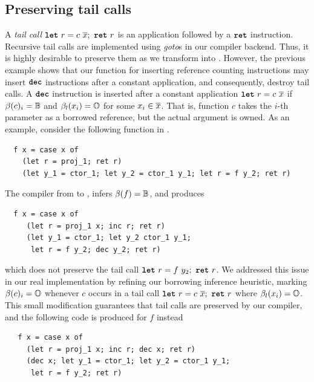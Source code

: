 \documentclass[sigconf]{acmart}
\begin{document}
\subsection*{Preserving tail calls}
A \emph{tail call} $\kw{let}\ r = c\ \many{x};\ \kw{ret}\ r$ is an
application followed by a $\texttt{\textbf{ret}}$ instruction. Recursive tail calls
are implemented using \emph{goto}s in our compiler backend. Thus, it
is highly desirable to preserve them as we transform \pureIR{} into
\rcIR{}. However, the previous example shows that our function for inserting reference
counting instructions may insert $\texttt{\textbf{dec}}$ instructions after a constant application, and
consequently, destroy tail calls. A $\texttt{\textbf{dec}}$ instruction is inserted after a constant application
$\kw{let}\ r = c\ \many{x}$ if $\beta(c)_i = \mathbb{B}{}$ and $\beta_l(x_i) = \mathbb{O}{}$ for some
$x_i \in \overline{x}$. That is, function $c$ takes the $i$-th
parameter as a borrowed reference, but the actual argument is owned. As an example,
consider the following function in \pureIR{}.
\begin{lstlisting}
  f x = case x of
    (let r = proj_1; ret r)
    (let y_1 = ctor_1; let y_2 = ctor_1 y_1; let r = f y_2; ret r)
\end{lstlisting}
The compiler from \pureIR{} to \rcIR{}, infers $\beta(f) = \mathbb{B}{}$, and produces
\begin{lstlisting}
  f x = case x of
     (let r = proj_1 x; inc r; ret r)
     (let y_1 = ctor_1; let y_2 ctor_1 y_1;
      let r = f y_2; dec y_2; ret r)
\end{lstlisting}
which does not preserve the tail call $\texttt{\textbf{let}}\ r = f\ y_2;\ \texttt{\textbf{ret}}\ r$.
We addressed this issue in our real implementation by refining our
borrowing inference heuristic, marking $\beta(c)_i = \mathbb{O}{}$ whenever
$c$ occurs in a tail call $\kw{let}\ r = c\ \many{x};\ \kw{ret}\ r$
where $\beta_l(x_i) = \mathbb{O}{}$. This small modification guarantees that tail calls are
preserved by our compiler, and the following \rcIR{} code is produced for $f$ instead
\begin{lstlisting}
   f x = case x of
     (let r = proj_1 x; inc r; dec x; ret r)
     (dec x; let y_1 = ctor_1; let y_2 = ctor_1 y_1;
      let r = f y_2; ret r)
\end{lstlisting}
\end{document}

